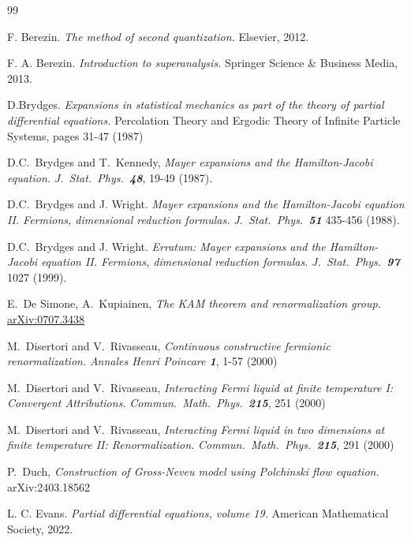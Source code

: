 \documentclass[12pt,twoside]{amsart}
\numberwithin{equation}{section}
\newcommand{\reftitel}[1]{{\sl #1}}
\begin{document}
%	

\begin{thebibliography}{99}

F. Berezin. \reftitel{The method of second quantization.} Elsevier, 2012.

F. A. Berezin. \reftitel{Introduction to superanalysis.} Springer Science \& Business Media, 2013.

D.Brydges.
\reftitel{Expansions in statistical mechanics as part of the theory of partial differential equations.} Percolation Theory and Ergodic Theory of Infinite Particle Systems, pages 31-47 (1987)

D.C.\ Brydges and T.\ Kennedy, 
\reftitel{Mayer expansions and the Hamilton-Jacobi equation.} {\em J.\ Stat.\ Phys.\ \bf 48}, 19-49 (1987).

D.C.\ Brydges and J. Wright. 
\reftitel{Mayer expansions and the Hamilton-Jacobi equation II. Fermions, dimensional reduction formulas.} {\em J.\ Stat.\ Phys.\ \bf 51} 435-456 (1988).

D.C.\ Brydges and J. Wright. 
\reftitel{Erratum: Mayer expansions and the Hamilton-Jacobi equation II. Fermions, dimensional reduction formulas.} {\em J.\ Stat.\ Phys.\ \bf 97} 1027 (1999).

E.\ De Simone, A.\ Kupiainen, \reftitel{The KAM theorem and renormalization group.} \href{https://arxiv.org/abs/0707.3438}{arXiv:0707.3438}

M.\ Disertori and V.\ Rivasseau, 
\reftitel{Continuous constructive fermionic renormalization.}
 {\em Annales Henri Poincare \bf 1}, 1-57 (2000)

M.\ Disertori and V.\ Rivasseau, 
\reftitel{Interacting Fermi liquid at finite temperature  I: Convergent Attributions.}
 {\em Commun.\ Math.\ Phys.\
\bf 215}, 251  (2000)

M.\ Disertori and V.\ Rivasseau, 
\reftitel{Interacting Fermi liquid in two dimensions at finite temperature II: Renormalization.}
 {\em Commun.\ Math.\ Phys.\
\bf 215}, 291  (2000)

P.\ Duch, \reftitel{Construction of Gross-Neveu model using Polchinski flow equation.}
arXiv:2403.18562

L. C. Evans. \reftitel{Partial differential equations, volume 19.}  American Mathematical Society, 2022.


\end{thebibliography}
\end{document}
